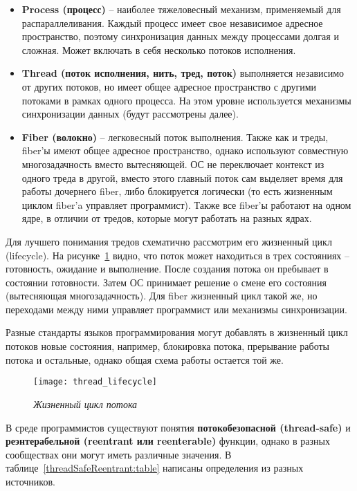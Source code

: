 \begin{itemize}
    \item\textbf{Process (процесс)} -- наиболее тяжеловесный механизм, применяемый для распараллеливания. Каждый процесс имеет свое независимое адресное пространство, поэтому синхронизация данных между процессами долгая и сложная. Может включать в себя несколько потоков исполнения.
    \item\textbf{Thread (поток исполнения, нить, тред, поток)} выполняется независимо от других потоков, но имеет общее адресное пространство с другими потоками в рамках одного процесса. На этом уровне используется механизмы синхронизации данных (будут рассмотрены далее).
    \item\textbf{Fiber (волокно)} -- легковесный поток выполнения. Также как и треды, fiber'ы имеют общее адресное пространство, однако используют совместную многозадачность вместо вытесняющей. ОС не переключает контекст из одного треда в другой, вместо этого главный поток сам выделяет время для работы дочернего fiber, либо блокируется логически (то есть жизненным циклом fiber'a управляет программист). Также все fiber'ы работают на одном ядре, в отличии от тредов, которые могут работать на разных ядрах.
\end{itemize}

Для лучшего понимания тредов схематично рассмотрим его жизненный цикл (lifecycle). На рисунке~\ref{threadLifecycle:image} видно, что поток может находиться в трех состояниях -- готовность, ожидание и выполнение. После создания потока он пребывает в состоянии готовности. Затем ОС принимает решение о смене его состояния (вытесняющая многозадачность). Для fiber жизненный цикл такой же, но переходами между ними управляет программист или механизмы синхронизации.

Разные стандарты языков программирования могут добавлять в жизненный цикл потоков новые состояния, например, блокировка потока, прерывание работы потока и остальные, однако общая схема работы остается той же.

\begin{figure}[H]
    \texttt{[image: thread\_lifecycle]}
    \caption{\textit{Жизненный цикл потока}}
    \label{threadLifecycle:image}
\end{figure}

\sloppy
В среде программистов существуют понятия \textbf{потокобезопасной (thread-safe)} и \textbf{реэнтерабельной (reentrant или reenterable)} функции, однако в разных сообществах они могут иметь различные значения. В таблице~\ref{threadSafeReentrant:table} написаны определения из разных источников.

